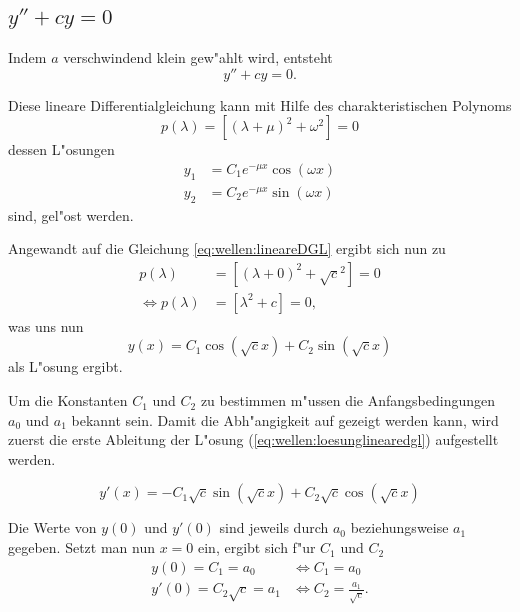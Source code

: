 \subsection{\texorpdfstring{$y''+cy = 0$}{y''+cy = 0}}
Indem $a$ verschwindend klein gew"ahlt wird, entsteht
\begin{equation}
	y''+ cy = 0.
	\label{eq:wellen:lineareDGL}
\end{equation}

Diese lineare Differentialgleichung kann mit Hilfe des charakteristischen 
Polynoms
\begin{equation*}
	p(\lambda) = [(\lambda+\mu)^2+\omega^2] = 0
\end{equation*}
dessen L"osungen
\begin{equation*}
	\begin{split}
		y_1 &= C_1e^{-\mu x}\cos(\omega x) \\
		y_2 &= C_2e^{-\mu x}\sin(\omega x)
	\end{split}
\end{equation*}
sind, gel"ost werden.

Angewandt auf die Gleichung \ref{eq:wellen:lineareDGL} ergibt sich nun zu
\begin{equation*}
	\begin{split}
		p(\lambda) &= [(\lambda+0)^2+\sqrt{c}^2] = 0 \\
		\Leftrightarrow p(\lambda) &= [\lambda^2+c] = 0,
	\end{split}
\end{equation*}
was uns nun
\begin{equation}
	y(x) = C_1 \cos(\sqrt{c}x) + C_2 \sin(\sqrt{c}x)
	\label{eq:wellen:loesunglinearedgl}
\end{equation}
als L"osung ergibt.

Um die Konstanten $C_1$ und $C_2$ zu bestimmen m"ussen die Anfangsbedingungen 
$a_0$ und $a_1$ bekannt sein. Damit die Abh"angigkeit auf gezeigt werden kann, 
wird zuerst die erste Ableitung der L"osung (\ref{eq:wellen:loesunglinearedgl}) 
aufgestellt werden.

\begin{equation}
	y'(x)=-C_1 \sqrt{c} \sin(\sqrt{c}x) + C_2 \sqrt{c} \cos(\sqrt{c}x)
\end{equation}

Die Werte von $y(0)$ und $y'(0)$ sind jeweils durch $a_0$ beziehungsweise $a_1$ 
gegeben. Setzt man nun $x = 0$ ein, ergibt sich f"ur $C_1$ und $C_2$
\begin{equation}
	\begin{split}
		y(0) = C_1 = a_0 &\Leftrightarrow C_1 = a_0 \\
		y'(0) = C_2 \sqrt{c} = a_1 &\Leftrightarrow C_2 = \frac{a_1}{\sqrt{c}}.
	\end{split}
\end{equation}

